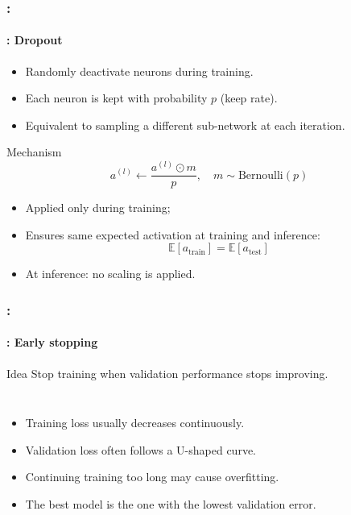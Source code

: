 \documentclass[xcolor=table]{beamer}
\begin{document}
\begin{frame}
	\frametitle{\insertshortsubtitle: \insertsection}
	\framesubtitle{\insertsubsection: Dropout \cite{2014-srivastava}}
	
	\begin{itemize}
		\item Randomly deactivate neurons during training.
		\item Each neuron is kept with probability $p$ (keep rate).
		\item Equivalent to sampling a different sub-network at each iteration.
	\end{itemize}
	
	\begin{block}{Mechanism}
		\[
		a^{(l)} \leftarrow \frac{a^{(l)} \odot m}{p}, \quad m \sim \text{Bernoulli}(p)
		\]
	\end{block}
	
	\begin{itemize}
		\item Applied only during training;
		\item Ensures same expected activation at training and inference:
		\[
		\mathbb{E}[a_{\text{train}}] = \mathbb{E}[a_{\text{test}}]
		\]
		\item At inference: no scaling is applied.
	\end{itemize}
	
\end{frame}


\begin{frame}
	\frametitle{\insertshortsubtitle: \insertsection}
	\framesubtitle{\insertsubsection: Early stopping}

	\begin{block}{Idea}
		Stop training when validation performance stops improving.
	\end{block}
	
	\begin{columns}
		
		
		\begin{itemize}
			\item Training loss usually decreases continuously.
			\item Validation loss often follows a U-shaped curve.
			\item Continuing training too long may cause overfitting.
			\item The best model is the one with the lowest validation error.
		\end{itemize}
		
		
		\begin{center}
		\end{center}
		
	\end{columns}
\end{frame}
\end{document}
